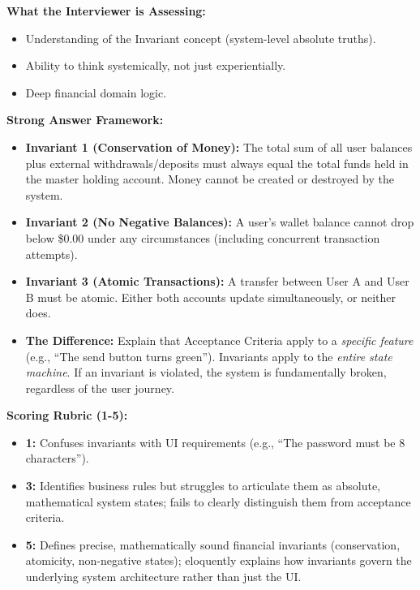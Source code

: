 \textbf{What the Interviewer is Assessing:}

\begin{itemize}
\tightlist
\item
  Understanding of the Invariant concept (system-level absolute truths).
\item
  Ability to think systemically, not just experientially.
\item
  Deep financial domain logic.
\end{itemize}

\textbf{Strong Answer Framework:}

\begin{itemize}
\tightlist
\item
  \textbf{Invariant 1 (Conservation of Money):} The total sum of all
  user balances plus external withdrawals/deposits must always equal the
  total funds held in the master holding account. Money cannot be
  created or destroyed by the system.
\item
  \textbf{Invariant 2 (No Negative Balances):} A user's wallet balance
  cannot drop below \$0.00 under any circumstances (including concurrent
  transaction attempts).
\item
  \textbf{Invariant 3 (Atomic Transactions):} A transfer between User A
  and User B must be atomic. Either both accounts update simultaneously,
  or neither does.
\item
  \textbf{The Difference:} Explain that Acceptance Criteria apply to a
  \emph{specific feature} (e.g., ``The send button turns green'').
  Invariants apply to the \emph{entire state machine}. If an invariant
  is violated, the system is fundamentally broken, regardless of the
  user journey.
\end{itemize}

\textbf{Scoring Rubric (1-5):}

\begin{itemize}
\tightlist
\item
  \textbf{1:} Confuses invariants with UI requirements (e.g., ``The
  password must be 8 characters'').
\item
  \textbf{3:} Identifies business rules but struggles to articulate them
  as absolute, mathematical system states; fails to clearly distinguish
  them from acceptance criteria.
\item
  \textbf{5:} Defines precise, mathematically sound financial invariants
  (conservation, atomicity, non-negative states); eloquently explains
  how invariants govern the underlying system architecture rather than
  just the UI.
\end{itemize}

